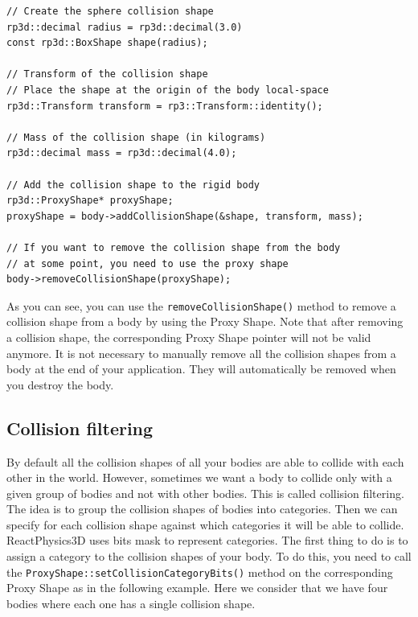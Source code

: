 \documentclass[a4paper,12pt]{article}
\begin{document}
    \begin{lstlisting}
// Create the sphere collision shape
rp3d::decimal radius = rp3d::decimal(3.0)
const rp3d::BoxShape shape(radius);

// Transform of the collision shape
// Place the shape at the origin of the body local-space
rp3d::Transform transform = rp3::Transform::identity();

// Mass of the collision shape (in kilograms)
rp3d::decimal mass = rp3d::decimal(4.0);

// Add the collision shape to the rigid body
rp3d::ProxyShape* proxyShape;
proxyShape = body->addCollisionShape(&shape, transform, mass);

// If you want to remove the collision shape from the body
// at some point, you need to use the proxy shape
body->removeCollisionShape(proxyShape);
  \end{lstlisting}

    \vspace{0.6cm}

    As you can see, you can use the \texttt{removeCollisionShape()} method to remove a collision shape from a body by using the Proxy Shape. Note that
    after removing a collision shape, the corresponding Proxy Shape pointer will not be valid anymore. It is not necessary to manually remove all the collision shapes from
    a body at the end of your application. They will automatically be removed when you destroy the body.

    \subsection{Collision filtering}
    \label{sec:collisionfiltering}

    By default all the collision shapes of all your bodies are able to collide with each other in the world. However, sometimes we want a body to collide only with a given
    group of bodies and not with other bodies. This is called collision filtering. The idea is to group the collision shapes of bodies into categories. Then we can specify
    for each collision shape against which categories it will be able to collide. \\

    ReactPhysics3D uses bits mask to represent categories. The first thing to do is to assign a category to the collision shapes of your body. To do this, you need to
    call the \texttt{ProxyShape::setCollisionCategoryBits()} method on the corresponding Proxy Shape as in the following example. Here we consider that we have four bodies
    where each one has a single collision shape. \\
\end{document}
